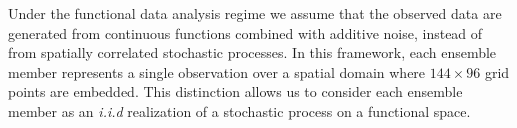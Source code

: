 \documentclass[12pt]{article}
\begin{document}




Under the functional data analysis regime we assume that the observed data are generated from continuous functions combined with additive noise, instead of from spatially correlated stochastic processes. In this framework, each ensemble member represents a single observation over a spatial domain where $144 \times 96$ grid points are embedded. This distinction allows us to consider each ensemble member as an \textit{i.i.d} realization of a stochastic process on a functional space. %
\end{document}
